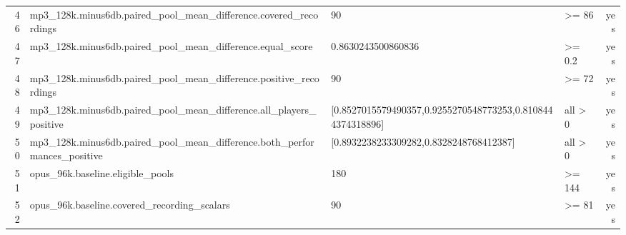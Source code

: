 \documentclass{article}
\begin{document}
\begin{longtable}{r p{5cm} p{4cm} p{2.5cm} r}
46 & mp3\_\allowbreak{}128k.\allowbreak{}minus6db.\allowbreak{}paired\_\allowbreak{}pool\_\allowbreak{}mean\_\allowbreak{}difference.\allowbreak{}covered\_\allowbreak{}recordings & 90 & >= 86 & yes \\
47 & mp3\_\allowbreak{}128k.\allowbreak{}minus6db.\allowbreak{}paired\_\allowbreak{}pool\_\allowbreak{}mean\_\allowbreak{}difference.\allowbreak{}equal\_\allowbreak{}score & 0.\allowbreak{}8630243500860836 & >= 0.\allowbreak{}2 & yes \\
48 & mp3\_\allowbreak{}128k.\allowbreak{}minus6db.\allowbreak{}paired\_\allowbreak{}pool\_\allowbreak{}mean\_\allowbreak{}difference.\allowbreak{}positive\_\allowbreak{}recordings & 90 & >= 72 & yes \\
49 & mp3\_\allowbreak{}128k.\allowbreak{}minus6db.\allowbreak{}paired\_\allowbreak{}pool\_\allowbreak{}mean\_\allowbreak{}difference.\allowbreak{}all\_\allowbreak{}players\_\allowbreak{}positive & [0.\allowbreak{}8527015579490357,\allowbreak{}0.\allowbreak{}9255270548773253,\allowbreak{}0.\allowbreak{}8108444374318896] & all > 0 & yes \\
50 & mp3\_\allowbreak{}128k.\allowbreak{}minus6db.\allowbreak{}paired\_\allowbreak{}pool\_\allowbreak{}mean\_\allowbreak{}difference.\allowbreak{}both\_\allowbreak{}performances\_\allowbreak{}positive & [0.\allowbreak{}8932238233309282,\allowbreak{}0.\allowbreak{}8328248768412387] & all > 0 & yes \\
51 & opus\_\allowbreak{}96k.\allowbreak{}baseline.\allowbreak{}eligible\_\allowbreak{}pools & 180 & >= 144 & yes \\
52 & opus\_\allowbreak{}96k.\allowbreak{}baseline.\allowbreak{}covered\_\allowbreak{}recording\_\allowbreak{}scalars & 90 & >= 81 & yes \\

\end{longtable}
\end{document}
